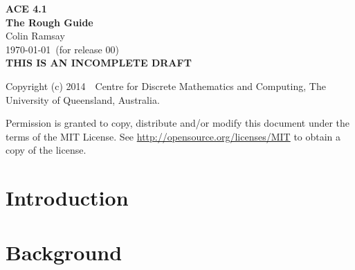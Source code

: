 \documentclass[12pt,a4paper,twoside]{cramrpt}
\begin{document}

\pagestyle{empty}

\vspace*{40mm}

\begin{center}
{\sffamily\bfseries\Large ACE 4.1}
\\[1.25ex] {\bfseries\large The Rough Guide}
\\[3.0ex] {\large Colin Ramsay} 
\\[1.0ex] {\today\ (for release 00)}
\\[5ex] {\sffamily\bfseries\Large THIS IS AN INCOMPLETE DRAFT}
\end{center}


\newpage
\pagestyle{plain}
\setcounter{page}{2}

\vspace*{\fill}

Copyright (c) 2014\ \   Centre for Discrete Mathematics and Computing, 
                    The University of Queensland, Australia.

Permission is granted to copy, distribute and/or modify this document
  under the terms of the MIT License.
See \url{http://opensource.org/licenses/MIT} to obtain a copy of the license.


\newpage
{}
\tableofcontents

\newpage
{}
\listoffigures

\newpage
{}
\listoftables


\newpage
\setcounter{page}{1}

\chapter{Introduction}



\chapter{Background}

\end{document}
